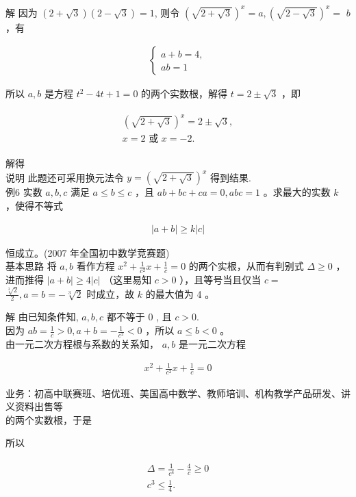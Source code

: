 \documentclass[10pt]{article}
\begin{document}
解 因为 $(2+\sqrt{3})(2-\sqrt{3})=1$, 则令 $(\sqrt{2+\sqrt{3}})^{x}=a,(\sqrt{2-\sqrt{3}})^{x}=$ $b$ ，有

\begin{align*}
\left\{\begin{array}{l}
a+b=4, \\
a b=1
\end{array}\right.
\end{align*}

所以 $a, b$ 是方程 $t^{2}-4 t+1=0$ 的两个实数根，解得 $t=2 \pm \sqrt{3}$ ，即

\begin{align*}
\begin{gathered}
(\sqrt{2+\sqrt{3}})^{x}=2 \pm \sqrt{3}, \\
x=2 \text { 或 } x=-2 .
\end{gathered}
\end{align*}

解得\\
说明 此题还可采用换元法令 $y=(\sqrt{2+\sqrt{3}})^{x}$ 得到结果.\\
例6 实数 $a, b, c$ 满足 $a \leqslant b \leqslant c$ ，且 $a b+b c+c a=0, a b c=1$ 。求最大的实数 $k$ ，使得不等式

\begin{align*}
|a+b| \geqslant k|c|
\end{align*}

恒成立。(2007 年全国初中数学竞赛题)\\
基本思路 将 $a, b$ 看作方程 $x^{2}+\frac{1}{c^{2}} x+\frac{1}{c}=0$ 的两个实根，从而有判别式 $\Delta \geqslant 0$ ，进而推得 $|a+b| \geqslant 4|c|$ （这里易知 $c>0$ ），且等号当且仅当 $c=$ $\frac{\sqrt[3]{2}}{2}, a=b=-\sqrt[3]{2}$ 时成立，故 $k$ 的最大值为 4 。

解 由已知条件知, $a, b, c$ 都不等于 0 , 且 $c>0$.\\
因为 $a b=\frac{1}{c}>0, a+b=-\frac{1}{c^{2}}<0$ ，所以 $a \leqslant b<0$ 。\\
由一元二次方程根与系数的关系知， $a, b$ 是一元二次方程

\begin{align*}
x^{2}+\frac{1}{c^{2}} x+\frac{1}{c}=0
\end{align*}

业务：初高中联赛班、培优班、美国高中数学、教师培训、机构教学产品研发、讲义资料出售等\\
的两个实数根，于是

所以

\begin{align*}
\begin{gathered}
\Delta=\frac{1}{c^{4}}-\frac{4}{c} \geqslant 0 \\
c^{3} \leqslant \frac{1}{4} .
\end{gathered}
\end{align*}
\end{document}
